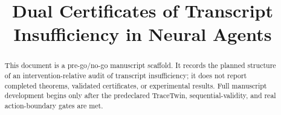 \documentclass[conference,compsoc]{IEEEtran}
\title{Dual Certificates of Transcript Insufficiency in Neural Agents}
\author{}
\begin{document}
\maketitle

\begin{abstract}
This document is a pre-go/no-go manuscript scaffold. It records the planned
structure of an intervention-relative audit of transcript insufficiency; it
does not report completed theorems, validated certificates, or experimental
results. Full manuscript development begins only after the predeclared
TraceTwin, sequential-validity, and real action-boundary gates are met.
\end{abstract}






\end{document}
